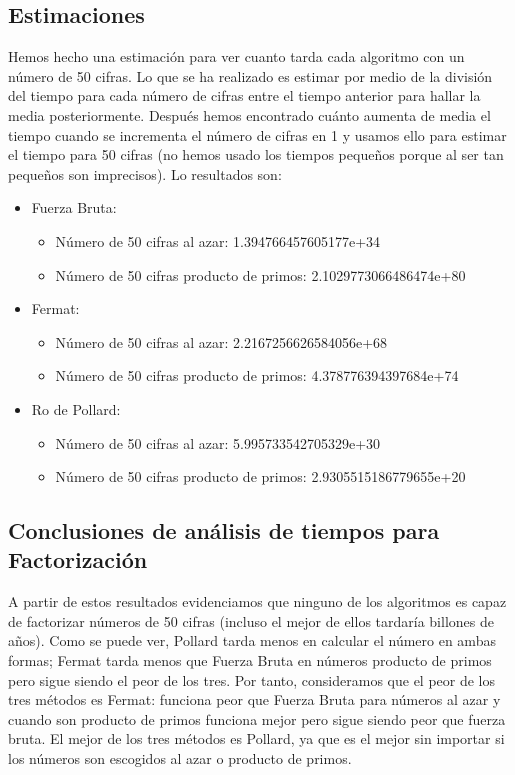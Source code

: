 \documentclass{article}
\begin{document}
\subsection*{Estimaciones}
    Hemos hecho una  estimación para ver cuanto tarda cada algoritmo con un número de 50 cifras. Lo que se ha realizado es estimar por medio de la división del tiempo para cada número de cifras entre el tiempo anterior para hallar la media posteriormente. Después hemos encontrado cuánto aumenta de media el tiempo cuando se incrementa el número de cifras en 1 y usamos ello para estimar el tiempo para 50 cifras (no hemos usado los tiempos pequeños porque al ser tan pequeños son imprecisos).
    Lo resultados son:
    \begin{itemize}
        \item Fuerza Bruta:
        \begin{itemize}
            \item Número de 50 cifras al azar: 1.394766457605177e+34
            \item Número de 50 cifras producto de primos: 2.1029773066486474e+80
        \end{itemize}
        \item Fermat:
        \begin{itemize}
            \item Número de 50 cifras al azar: 2.2167256626584056e+68
            \item Número de 50 cifras producto de primos: 4.378776394397684e+74
        \end{itemize}
        \item Ro de Pollard:
        \begin{itemize}
            \item Número de 50 cifras al azar: 5.995733542705329e+30
            \item Número de 50 cifras producto de primos: 2.9305515186779655e+20
        \end{itemize}
    \end{itemize}

    \subsection*{Conclusiones de análisis de tiempos para Factorización}
    A partir de estos resultados evidenciamos que ninguno de los algoritmos es capaz de factorizar números de 50 cifras (incluso el mejor de ellos tardaría billones de años). Como se puede ver, Pollard tarda menos en calcular el número en ambas formas; Fermat tarda menos que Fuerza Bruta en números producto de primos pero sigue siendo el peor de los tres.
    \newblock
    Por tanto, consideramos que el peor de los tres métodos es Fermat: funciona peor que Fuerza Bruta para números al azar y cuando son producto de primos funciona mejor pero sigue siendo peor que fuerza bruta. El mejor de los tres métodos es Pollard, ya que es el mejor sin importar si los números son escogidos al azar o producto de primos.
\end{document}

